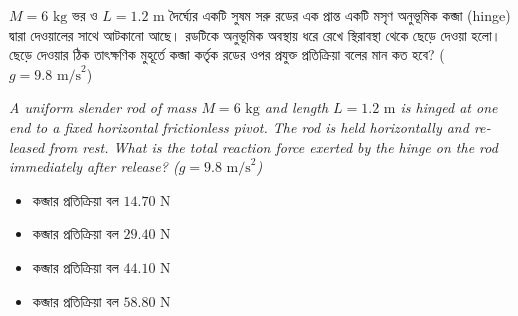 \documentclass[12pt, a4paper]{article}
\begin{document}
{{\newpage



\newpage

\begin{tcolorbox}[questionbox={প্রশ্ন (Question) 29}]
    \noindent
    $M = 6\text{ kg}$ ভর ও $L = 1.2\text{ m}$ দৈর্ঘ্যের একটি সুষম সরু রডের এক প্রান্ত একটি মসৃণ অনুভূমিক কব্জা (hinge) দ্বারা দেওয়ালের সাথে আটকানো আছে। রডটিকে অনুভূমিক অবস্থায় ধরে রেখে স্থিরাবস্থা থেকে ছেড়ে দেওয়া হলো। ছেড়ে দেওয়ার ঠিক তাৎক্ষণিক মুহূর্তে কব্জা কর্তৃক রডের ওপর প্রযুক্ত প্রতিক্রিয়া বলের মান কত হবে? ($g = 9.8\text{ m/s}^2$)
    
    \vspace{0.8em}
    \begin{english}
    \noindent\textit{\color{darkgray}
    A uniform slender rod of mass $M = 6\text{ kg}$ and length $L = 1.2\text{ m}$ is hinged at one end to a fixed horizontal frictionless pivot. The rod is held horizontally and released from rest. What is the total reaction force exerted by the hinge on the rod immediately after release? ($g = 9.8\text{ m/s}^2$)
    }
    \end{english}
\end{tcolorbox}

\vspace{1em}
\begin{center}
\end{center}
\vspace{1em}

\begin{itemize}[label={}, leftmargin=1cm, itemsep=0.5em]
    \item[\textbf{A)}] কব্জার প্রতিক্রিয়া বল $14.70\text{ N}$
    \item[\textbf{B)}] কব্জার প্রতিক্রিয়া বল $29.40\text{ N}$
    \item[\textbf{C)}] কব্জার প্রতিক্রিয়া বল $44.10\text{ N}$
    \item[\textbf{D)}] কব্জার প্রতিক্রিয়া বল $58.80\text{ N}$
\end{itemize}

}}
\end{document}
